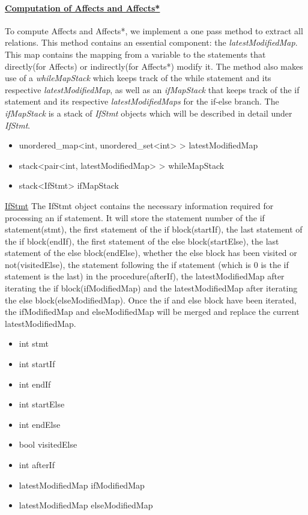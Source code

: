 \documentclass[12pt]{article}
\begin{document}
{{{{{{{{{{{{\paragraph{\underline{Computation of Affects and Affects*}\newline} To compute Affects and Affects*, we implement a one pass method to extract all relations. This method contains an essential component: the {\textit{latestModifiedMap}}. This map contains the mapping from a variable to the statements that directly(for Affects) or indirectly(for Affects*) modify it. The method also makes use of a {\textit{whileMapStack}} which keeps track of the while statement and its respective {\textit{latestModifiedMap}}, as well as an {\textit{ifMapStack}} that keeps track of the if statement and its respective {\textit{latestModifiedMaps}} for the if-else branch. The {\textit{ifMapStack}} is a stack of {\textit{IfStmt}} objects which will be described in detail under {\textit{IfStmt}}.
\begin{itemize}
\item unordered\_map<int, unordered\_set<int> > latestModifiedMap
\item stack<pair<int, latestModifiedMap> > whileMapStack
\item stack<IfStmt> ifMapStack
\end{itemize}
{\underline{{IfStmt}}\newline
The IfStmt object contains the necessary information required for processing an if statement. It will store the statement number of the if statement(stmt), the first statement of the if block(startIf), the last statement of the if block(endIf), the first statement of the else block(startElse), the last statement of the else block(endElse), whether the else block has been visited or not(visitedElse), the statement following the if statement (which is 0 is the if statement is the last) in the procedure(afterIf), the latestModifiedMap after iterating the if block(ifModifiedMap) and the latestModifiedMap after iterating the else block(elseModifiedMap). Once the if and else block have been iterated, the ifModifiedMap and elseModifiedMap will be merged and replace the current latestModifiedMap.
\begin{itemize}
\item int stmt
\item int startIf
\item int endIf
\item int startElse
\item int endElse
\item bool visitedElse
\item int afterIf
\item latestModifiedMap ifModifiedMap
\item latestModifiedMap elseModifiedMap
\end{itemize}

}}}}}}}}}}}}}
\end{document}

